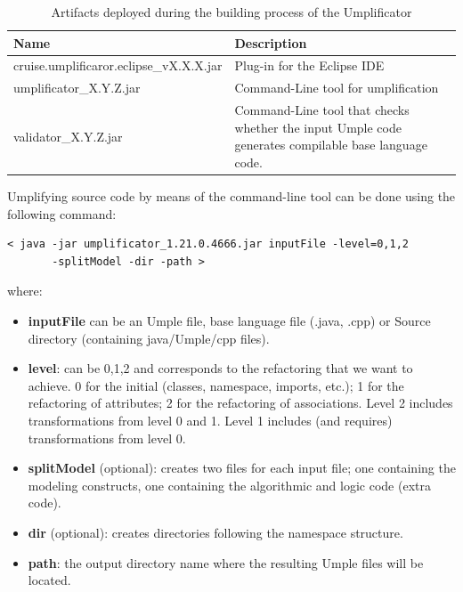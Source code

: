 \begin{table}[h]
\caption{Artifacts deployed during the building process of the Umplificator}
\label{table:jars}
\centering
\begin{tabular}{l|p{7cm}}
\toprule
\rowcolor[HTML]{BBDAFF}
\textbf{Name} & \textbf{Description}  \\ \midrule
cruise.umplificaror.eclipse\_vX.X.X.jar &  Plug-in for the Eclipse IDE 
\\ \hline
umplificator\_X.Y.Z.jar & Command-Line tool for umplification 
\\ \hline
validator\_X.Y.Z.jar & Command-Line tool that checks whether the input Umple code generates compilable base language code. 
\\ \bottomrule
\end{tabular}
\end{table}

Umplifying source code by means of the command-line tool can be done using the following command:

\vspace{\baselineskip}
\begin{lstlisting}[style=umplePlain]
< java -jar umplificator_1.21.0.4666.jar inputFile -level=0,1,2 
       -splitModel -dir -path >
\end{lstlisting}

where:
\begin{itemize}
\item \textbf{inputFile} can be an Umple file, base language file (.java, .cpp) or Source directory (containing java/Umple/cpp files).
\item \textbf{level}: can be 0,1,2 and corresponds to the refactoring that we want to achieve. 0 for the initial (classes, namespace, imports, etc.); 1 for the refactoring of attributes; 2 for the refactoring of associations. Level 2 includes transformations from level 0 and 1. Level 1 includes (and requires) transformations from level 0.
\item \textbf{splitModel} (optional): creates two files for each input file; one containing the modeling constructs, one containing the algorithmic and logic code (extra code). 
\item \textbf{dir} (optional): creates directories following the namespace structure.
\item \textbf{path}: the output directory name where the resulting Umple files will be located.
\end{itemize}

